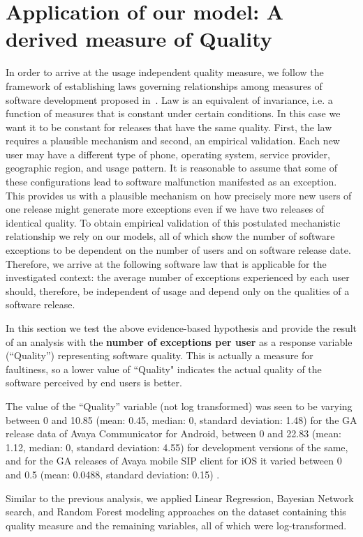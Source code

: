 \documentclass[smallextended]{svjour3}       %
\begin{document}
\section{Application of our model: A derived measure of Quality}\label{s:qual}
In order to arrive at the usage independent quality measure, we follow the framework of establishing laws governing relationships among measures of software development proposed in~\cite{mockuskeynote}. Law is an equivalent of invariance, i.e. a function of measures that is constant under certain conditions. In this case we want it to be constant for releases that have the same quality. First, the law requires a plausible mechanism and second, an empirical validation. Each new user may have a different type of phone, operating system, service provider, geographic region, and usage pattern. It is reasonable to assume that some of these configurations lead to software malfunction manifested as an exception. This provides us with a plausible mechanism on how precisely more new users of one release might generate more exceptions even if we have two releases of identical quality. To obtain empirical validation of this postulated mechanistic relationship we rely on our models, all of which show the number of software 
exceptions to be dependent on the number of users and on software release date. Therefore,
we arrive at the following software law that is applicable for the investigated context: the average number of 
exceptions experienced by each user should, therefore, be independent of usage and depend only on the qualities of a software release.

In this section we test the above evidence-based hypothesis and provide the result of an analysis with the \textbf{number of exceptions per user} as a response variable (``Quality'') representing software quality. 
This is actually a measure for faultiness, so a lower value of ``Quality" indicates the actual quality of the software perceived by end users is better.

The value of the ``Quality'' variable (not log transformed) was seen to be varying between 0 and 10.85 (mean: 0.45, median: 0, standard deviation: 1.48) for the GA release data of Avaya Communicator for Android, between 0 and 22.83 (mean: 1.12, median: 0, standard deviation: 4.55) for development versions of the same, and for the GA releases of Avaya mobile SIP client for iOS it varied between 0 and 0.5 (mean: 0.0488, standard deviation: 0.15) . %

Similar to the previous analysis, we applied Linear Regression, Bayesian Network search, and 
Random Forest modeling approaches on the dataset containing this quality measure and the remaining variables, all of which were log-transformed. 
\end{document}
